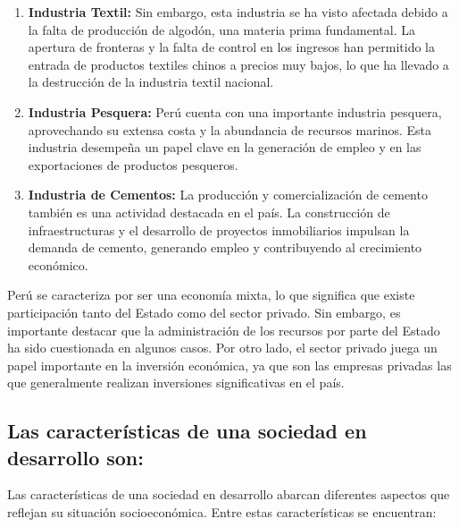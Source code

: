\documentclass[
  jou,
  floatsintext,
  longtable,
  a4paper,
  nolmodern,
  notxfonts,
  notimes,
  12pt,
  colorlinks=true,linkcolor=blue,citecolor=blue,urlcolor=blue]{apa7}
\begin{document}
\begin{enumerate}
\def\labelenumi{\arabic{enumi}.}
\item
  \textbf{Industria Textil:} Sin embargo, esta industria se ha visto
  afectada debido a la falta de producción de algodón, una materia prima
  fundamental. La apertura de fronteras y la falta de control en los
  ingresos han permitido la entrada de productos textiles chinos a
  precios muy bajos, lo que ha llevado a la destrucción de la industria
  textil nacional.
\item
  \textbf{Industria Pesquera:} Perú cuenta con una importante industria
  pesquera, aprovechando su extensa costa y la abundancia de recursos
  marinos. Esta industria desempeña un papel clave en la generación de
  empleo y en las exportaciones de productos pesqueros.
\item
  \textbf{Industria de Cementos:} La producción y comercialización de
  cemento también es una actividad destacada en el país. La construcción
  de infraestructuras y el desarrollo de proyectos inmobiliarios
  impulsan la demanda de cemento, generando empleo y contribuyendo al
  crecimiento económico.
\end{enumerate}

Perú se caracteriza por ser una economía mixta, lo que significa que
existe participación tanto del Estado como del sector privado. Sin
embargo, es importante destacar que la administración de los recursos
por parte del Estado ha sido cuestionada en algunos casos. Por otro
lado, el sector privado juega un papel importante en la inversión
económica, ya que son las empresas privadas las que generalmente
realizan inversiones significativas en el país.

\subsection{Las características de una sociedad en desarrollo
son:}\label{las-caracteruxedsticas-de-una-sociedad-en-desarrollo-son}

Las características de una sociedad en desarrollo abarcan diferentes
aspectos que reflejan su situación socioeconómica. Entre estas
características se encuentran:
\end{document}
